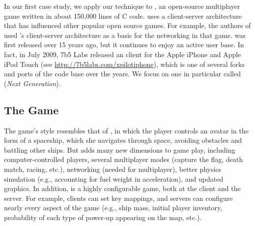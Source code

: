 In our first case study, we apply our technique to \xpilot, an
open-source multiplayer game written in about 150,000 lines of C code.
\xpilot uses a client-server architecture that has influenced other
popular open source games.  For example, the authors of \freeciv used
\xpilot's client-server architecture as a basis for the networking in
that game.  \xpilot was first released over 15 years ago, but it
continues to enjoy an active user base.  In fact, in July 2009, 7b5
Labs released an \xpilot client for the Apple iPhone and Apple iPod
Touch (see \url{http://7b5labs.com/xpilotiphone}), which is one of
several forks and ports of the \xpilot code base over the years.  We
focus on one in particular called \xpilotng ({\em \xpilot Next
Generation}).

\subsection{The Game}
\label{ssec:scv:xpilot:game}

The game's style resembles that of \asteroids, in which the player
controls an avatar in the form of a spaceship, which she navigates
through space, avoiding obstacles and battling other ships.  But
\xpilot adds many new dimensions to game play, including
computer-controlled players, several multiplayer modes (capture the
flag, death match, racing, etc.), networking (needed for multiplayer),
better physics simulation (e.g., accounting for fuel weight in
acceleration), and updated graphics.  In addition, \xpilot is a highly
configurable game, both at the client and the server.  For example,
clients can set key mappings, and servers can configure nearly every
aspect of the game (e.g., ship mass, initial player inventory,
probability of each type of power-up appearing on the map, etc.).


